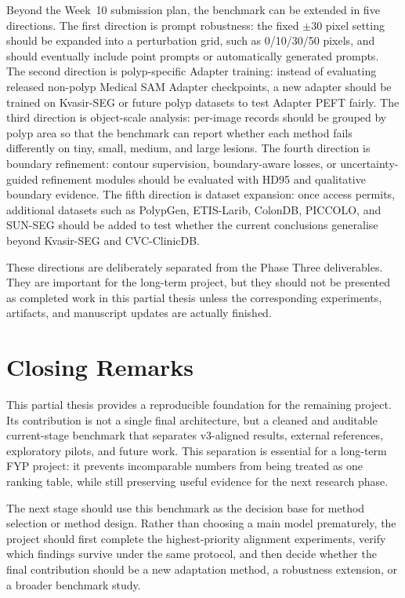 Beyond the Week~10 submission plan, the benchmark can be extended in five directions. The first direction is prompt robustness: the fixed $\pm30$ pixel setting should be expanded into a perturbation grid, such as 0/10/30/50 pixels, and should eventually include point prompts or automatically generated prompts. The second direction is polyp-specific Adapter training: instead of evaluating released non-polyp Medical SAM Adapter checkpoints, a new adapter should be trained on Kvasir-SEG or future polyp datasets to test Adapter PEFT fairly. The third direction is object-scale analysis: per-image records should be grouped by polyp area so that the benchmark can report whether each method fails differently on tiny, small, medium, and large lesions. The fourth direction is boundary refinement: contour supervision, boundary-aware losses, or uncertainty-guided refinement modules should be evaluated with HD95 and qualitative boundary evidence. The fifth direction is dataset expansion: once access permits, additional datasets such as PolypGen, ETIS-Larib, ColonDB, PICCOLO, and SUN-SEG should be added to test whether the current conclusions generalise beyond Kvasir-SEG and CVC-ClinicDB.

These directions are deliberately separated from the Phase Three deliverables. They are important for the long-term project, but they should not be presented as completed work in this partial thesis unless the corresponding experiments, artifacts, and manuscript updates are actually finished.

\section{Closing Remarks}
\label{sec:closing-remarks}

This partial thesis provides a reproducible foundation for the remaining project. Its contribution is not a single final architecture, but a cleaned and auditable current-stage benchmark that separates v3-aligned results, external references, exploratory pilots, and future work. This separation is essential for a long-term FYP project: it prevents incomparable numbers from being treated as one ranking table, while still preserving useful evidence for the next research phase.

The next stage should use this benchmark as the decision base for method selection or method design. Rather than choosing a main model prematurely, the project should first complete the highest-priority alignment experiments, verify which findings survive under the same protocol, and then decide whether the final contribution should be a new adaptation method, a robustness extension, or a broader benchmark study.
